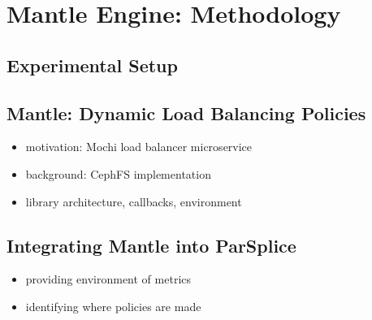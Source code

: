 \section{Mantle Engine: Methodology}

\subsection{Experimental Setup}

\subsection{Mantle: Dynamic Load Balancing Policies}

\begin{itemize}
  \item motivation: Mochi load balancer microservice
  \item background: CephFS implementation
  \item library architecture, callbacks, environment
\end{itemize}

\subsection{Integrating Mantle into ParSplice}

\begin{itemize}
  \item providing environment of metrics
  \item identifying where policies are made
\end{itemize}
